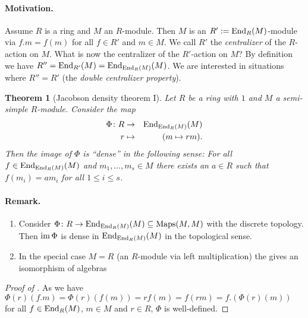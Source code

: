 \documentclass[12pt,a4paper]{scrartcl}
\theoremstyle{cplain}
\theoremstyle{cplain}
\newtheorem{thm}[thmcounter]{Theorem}
\theoremstyle{cplain}
\theoremstyle{definition}
\begin{document}
\begin{otherlanguage}{english}
\paragraph{Motivation.}
Assume $R$ is a ring and $M$ an $R$-module. Then $M$ is an $R' := \operatorname{End}_R(M)$-module via $f.m = f(m)$ for all $f\in R'$ and $m\in M$. We call $R'$ the \emph{centralizer} of the $R$-action on $M$. What is now the centralizer of the $R'$-action on $M$? By definition we have $R'' = \operatorname{End}_{R'}(M) = \operatorname{End}_{\operatorname{End}_{R}(M)}(M)$. We are interested in situations where $R'' = R'$ (the \emph{double centralizer property}).

\begin{thm}[Jacobson density theorem I] \label{thm:jacobson density I}
  Let $R$ be a ring with $1$ and $M$ a semisimple $R$-module. Consider the map
  \begin{eqnarray*}
    \Phi\colon R &\to& \operatorname{End}_{\operatorname{End}_{R}(M)}(M) \\
    r &\mapsto& (m \mapsto rm).
  \end{eqnarray*}
  Then the image of $\Phi$ is \enquote{dense} in the following sense: For all $f\in \operatorname{End}_{\operatorname{End}_{R}(M)}(M)$ and $m_1,\ldots,m_s\in M$ there exists an $a\in R$ such that $f(m_i) = am_i$ for all $1\le i\le s$.
\end{thm}

\paragraph{Remark.}
\begin{enumerate}
  \item Consider $\Phi\colon R \to \operatorname{End}_{\operatorname{End}_{R}(M)}(M) \subseteq \operatorname{Maps}(M,M)$ with the discrete topology. Then $\operatorname{im}\Phi$ is dense in $\operatorname{End}_{\operatorname{End}_{R}(M)}(M)$ in the topological sense.
  \item In the special case $M=R$ (an $R$-module via left multiplication) the  gives an isomorphism of algebras
  \begin{center}
  \end{center}
\end{enumerate}

\begin{proof}[Proof of ]
  As we have $\Phi(r)(f.m) = \Phi(r)(f(m)) = rf(m) = f(rm) = f.(\Phi(r)(m))$ for all $f\in \operatorname{End}_R(M)$, $m\in M$ and $r\in R$, $\Phi$ is well-defined.
  

\end{proof}
\end{otherlanguage}
\end{document}
